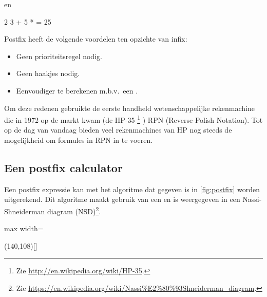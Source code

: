 \begin{cpplstShortInline}
en

\begin{coutput}
2 3 + 5 * = 25
\end{coutput}

Postfix heeft de volgende voordelen ten opzichte van infix:
\begin{itemize}
	\item Geen prioriteitsregel nodig.
	\item Geen haakjes nodig.
	\item Eenvoudiger te berekenen m.b.v.\ een .
\end{itemize}

Om deze redenen gebruikte de eerste handheld wetenschappelijke rekenmachine die in 1972 op de markt kwam (de HP-35%
\footnote{Zie \url{http://en.wikipedia.org/wiki/HP-35}.
}%
) RPN (Reverse Polish Notation).
Tot op de dag van vandaag bieden veel rekenmachines van HP nog steeds de mogelijkheid om formules in RPN in te voeren.

\subsection{Een postfix calculator}
Een postfix expressie kan met het algoritme dat gegeven is in \cref{fig:postfix} worden uitgerekend.
Dit algoritme maakt gebruik van een  en is weergegeven in een Nassi\hyp{}Shneiderman diagram (NSD)\footnote{%
	Zie \url{https://en.wikipedia.org/wiki/Nassi\%E2\%80\%93Shneiderman_diagram}.
}.

\begin{myFigure}[htbp]
	\centering
	\begin{adjustbox}{max width=\textwidth}
		\begin{struktogramm}(140,108)[]
			\change
			\change
			\ifend
			\ifend
			\whileend
			\change
			\ifend
		\end{struktogramm}
	\end{adjustbox}
	\caption{Algoritme voor het uitrekenen van een postfix expressie.}
	\label{fig:postfix}
\end{myFigure}


\end{cpplstShortInline}
